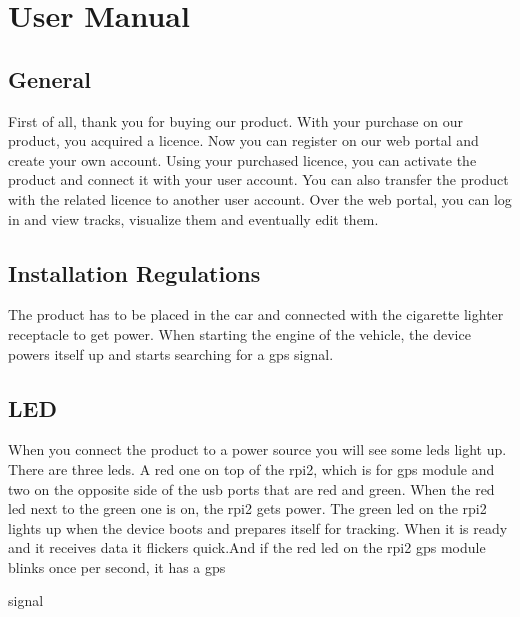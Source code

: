 \chapter{User Manual}
\section{General}
First of all, thank you for buying our product. With your purchase on our product, you acquired a licence. Now you can register on our web portal and create your own account. Using your purchased licence, you can activate the product and connect it with your user account. You can also transfer the product with the related licence to another user account. Over the web portal, you can log in and view tracks, visualize them and eventually edit them.
\section{Installation Regulations}
The product has to be placed in the car and connected with the cigarette lighter receptacle to get power. When starting the engine of the vehicle, the device powers itself up and starts searching for a \gls{gps} signal.
\section{LED}
When you connect the product to a power source you will see some \gls{led}s light up.
There are three \gls{led}s. A red one on top of the \gls{rpi2}, which is for \gls{gps} module and two on the opposite side of the \gls{usb} ports that are red and green.
When the red \gls{led} next to the green one is on, the \gls{rpi2} gets power.
The green \gls{led} on the \gls{rpi2} lights up when the device boots and prepares itself for tracking. When it is ready and it receives data it flickers quick.\clearpageauthor {}And if the red \gls{led} on the \gls{rpi2} \gls{gps} module blinks once per second, it has a \gls{gps} 

signal

